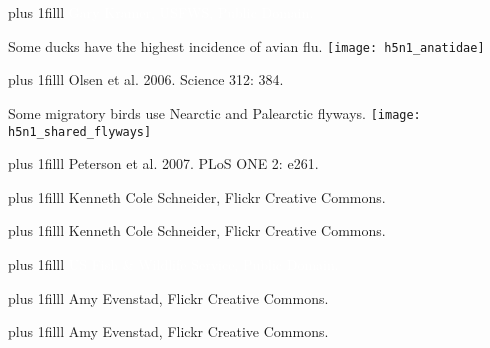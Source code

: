 \documentclass[t]{beamer}
\newcommand\imagecredit[1]{%
	\vskip0pt plus 1filll \tiny #1}%
\begin{document}
{
\begin{frame}[t,plain]{}
\imagecredit{\textcolor{white}{Gary Kramer, USFWS, Public Domain.}}
\end{frame}
}

{
\begin{frame}[t,plain]{Some ducks have the highest incidence of avian flu.}
	\texttt{[image: h5n1\_anatidae]}
	
	\imagecredit{\hfill Olsen et al. 2006. Science 312: 384.}
\end{frame}
}

{
\begin{frame}[t,plain]{Some migratory birds use Nearctic and Palearctic flyways.}
	\texttt{[image: h5n1\_shared\_flyways]}
	
	\imagecredit{\hfill Peterson et al. 2007. PLoS ONE 2: e261.}
\end{frame}
}

{
\begin{frame}[t,plain]{}
    	\imagecredit{\colorbox{white!80!gray}{Kenneth Cole Schneider, Flickr Creative Commons.}}
\end{frame}
}

{
\begin{frame}[t,plain]{}
	\imagecredit{\hfill Kenneth Cole Schneider, Flickr Creative Commons.}
\end{frame}
}

{
\begin{frame}[t,plain]{}
	\imagecredit{\textcolor{white}{US Fish \& Wildlife Service, Public Domain.}}
\end{frame}
}

{
\begin{frame}[t,plain]{}
	\imagecredit{\hfill Amy Evenstad, Flickr Creative Commons.}
\end{frame}
}

{
\begin{frame}[t,plain]{}
	\imagecredit{\hfill Amy Evenstad, Flickr Creative Commons.}
\end{frame}
}
\end{document}
